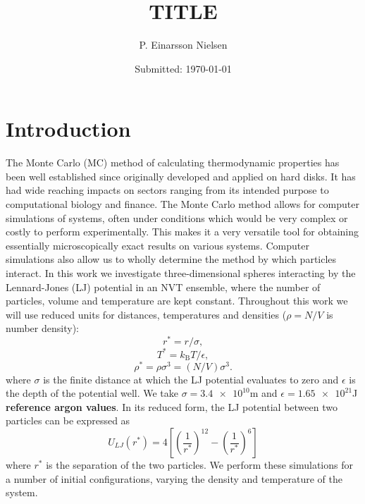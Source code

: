 \documentclass[10pt, twocolumn]{revtex4}    %
\begin{document}
                     


\title{TITLE} 
\date{Submitted: \today{}}
\author{P. Einarsson Nielsen}

\begin{abstract}
	\lipsum[1]

\end{abstract}

\maketitle
\thispagestyle{plain} %



\section{Introduction} \label{s:intro}

The Monte Carlo (MC) method of calculating thermodynamic properties has been well established since originally developed and applied on hard disks. It has had wide reaching impacts on sectors ranging from its intended purpose to computational biology and finance. The Monte Carlo method allows for computer simulations of systems, often under conditions which would be very complex or costly to perform experimentally. This makes it a very versatile tool for obtaining essentially microscopically exact results on various systems. Computer simulations also allow us to wholly determine the method by which particles interact. In this work we investigate three-dimensional spheres interacting by the Lennard-Jones (LJ) potential in an NVT ensemble, where the number of particles, volume and temperature are kept constant. Throughout this work we will use reduced units for distances, temperatures and densities ($\rho{}=N/V$ is number density):
\begin{displaymath}
r^{*} = r/\sigma{},
\end{displaymath}
\begin{displaymath}
T^{*} = k_\text{B}T/\epsilon{},
\end{displaymath}
\begin{displaymath}
\rho{}^{*} = \rho{}\sigma{}^{3} = (N/V)\sigma{}^{3}.
\end{displaymath}
where $\sigma{}$ is the finite distance at which the LJ potential evaluates to zero and $\epsilon{}$ is the depth of the potential well. We take $\sigma=\num{3.4e10}$m and $\epsilon=\num{1.65e21}$J \textbf{reference argon values}. In its reduced form, the LJ potential between two particles can be expressed as
\begin{equation}
U_{LJ}(r^{*}) = 4\left[\left(\frac{1}{r^{*}}\right)^{12}-\left(\frac{1}{r^{*}}\right)^{6}\right]
\end{equation}
where $r^{*}$ is the separation of the two particles.
We perform these simulations for a number of initial configurations, varying the density and temperature of the system.
\end{document}
